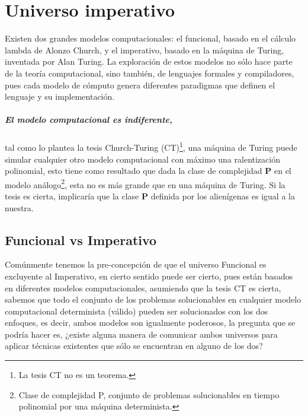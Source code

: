 
\chapter{Universo imperativo}

Existen dos grandes modelos computacionales: el funcional, basado en el cálculo lambda de Alonzo Church, y el imperativo, basado en la máquina de Turing, inventada por Alan Turing. La exploración de estos modelos no sólo hace parte de la teoría computacional, sino también, de lenguajes formales y compiladores, pues cada modelo de cómputo genera diferentes paradigmas que definen el lenguaje y su implementación.

\paragraph{El modelo computacional es indiferente,} tal como lo plantea la tesis Church-Turing (CT)\footnote{La tesis CT no es un teorema.}, una máquina de Turing puede simular cualquier otro modelo computacional con máximo una ralentización polinomial, esto tiene como resultado que dada la clase de complejidad \textbf{P}  en el modelo análogo\footnote{Clase de complejidad P, conjunto de problemas solucionables en tiempo polinomial por una máquina determinista.}, esta no es más grande que en una máquina de Turing. Si la tesis es cierta, implicaría que la clase \textbf{P} definida por los alienígenas es igual a la nuestra. \cite{Arora2009}




\section{Funcional vs Imperativo}

Comúnmente tenemos la pre-concepción de que el universo Funcional es excluyente al Imperativo, en cierto sentido puede ser cierto, pues están basados en diferentes modelos computacionales, asumiendo que la tesis CT es cierta, sabemos que todo el conjunto de los problemas solucionables en cualquier modelo computacional determinista (válido) pueden ser solucionados con los dos enfoques, es decir, ambos modelos son igualmente poderosos, la pregunta que se podría hacer es, ¿existe alguna manera de comunicar ambos universos para aplicar técnicas existentes que sólo se encuentran en alguno de los dos?

